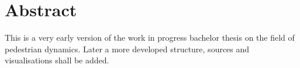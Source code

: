 
\section*{Abstract}
This is a very early version of the work in progress bachelor thesis on the field of pedestrian dynamics. 
Later a more developed structure, sources and visualisations shall be added. 